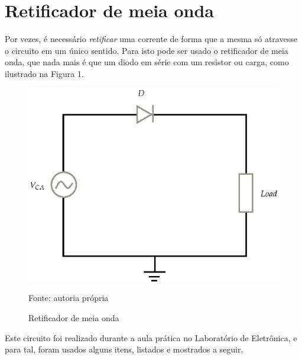 \documentclass[
	12pt,				%
	openright,			%
	twoside,			%
	a4paper,			%
	article,	
	english,			%
	french,				%
	spanish,			%
	brazil				%
	]{abntex2}
\begin{document}
\textual

\section{Retificador de meia onda}
\par Por vezes, é necessário \emph{retificar} uma corrente de forma que a mesma só atravesse o circuito em um único sentido. Para isto pode ser usado o retificador de meia onda, que nada mais é que um diodo em série com um resistor ou carga, como ilustrado na Figura 1.

\begin{figure}[H]\centering
\caption{Retificador de meia onda}
\includegraphics[trim=4cm 0cm 2mm 0cm,clip,scale=0.7]{figFinal.eps}
\begin{center}Fonte: autoria própria\end{center}
\end{figure}

\par Este circuito foi realizado durante a aula prática no Laboratório de Eletrônica, e para tal, foram usados alguns itens, listados e mostrados a seguir.
\end{document}
